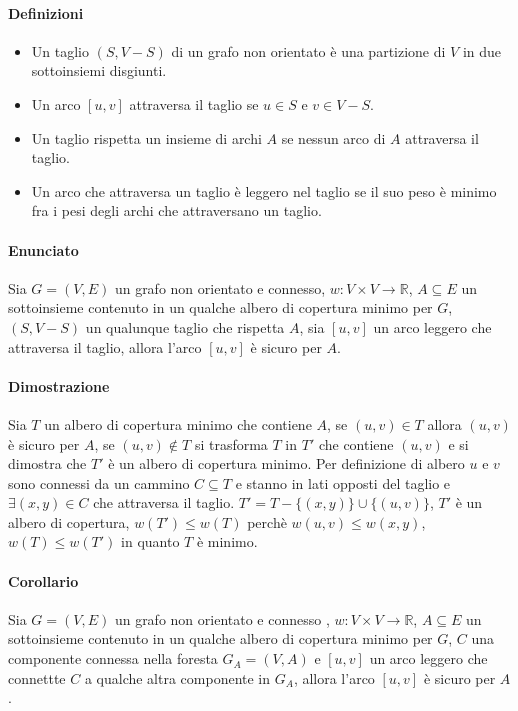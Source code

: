 \paragraph{Definizioni}
\begin{itemize}
	\item Un taglio $(S, V - S)$ di un grafo non orientato \`e una partizione di $V$ in due sottoinsiemi disgiunti.
	\item Un arco $[u, v]$ attraversa il taglio se $u\in S$ e $v\in V-S$.
	\item Un taglio rispetta un insieme di archi $A$ se nessun arco di $A$ attraversa il taglio.
	\item Un arco che attraversa un taglio \`e leggero nel taglio se il suo peso \`e minimo fra i pesi degli archi che attraversano un taglio.
\end{itemize}
\paragraph{Enunciato}
Sia $G=(V, E)$ un grafo non orientato e connesso, $w:V\times V\rightarrow\mathbb{R}$, $A\subseteq E$ un sottoinsieme contenuto in un qualche albero di copertura minimo per $G$, 
$(S, V-S)$ un qualunque taglio che rispetta $A$, sia $[u, v]$ un arco leggero che attraversa il taglio, allora l'arco $[u, v]$ \`e sicuro per $A$. 
\paragraph{Dimostrazione}
Sia $T$ un albero di copertura minimo che contiene $A$, se $(u, v)\in T$ allora $(u, v)$ \`e sicuro per $A$, se $(u, v)\not\in T$ si trasforma $T$ in $T'$ che contiene $(u, v)$ e si 
dimostra che $T'$ \`e un albero di copertura minimo. Per definizione di albero $u$ e $v$ sono connessi da un cammino $C\subseteq T$ e stanno in lati opposti del taglio e $\exists(x, y)
\in C$ che attraversa il taglio. $T'=T-\{(x, y)\}\cup\{(u, v)\}$, $T'$ \`e un albero di copertura, $w(T')\le w(T)$ perch\`e $w(u, v)\le w(x, y)$, $w(T)\le w(T')$ in quanto $T$ \`e 
minimo.
\paragraph{Corollario}
Sia $G=(V, E)$ un grafo non orientato e connesso , $w:V\times V\rightarrow\mathbb{R}$, $A\subseteq E$ un sottoinsieme contenuto in un qualche albero di copertura minimo per $G$, $C$
una componente connessa nella foresta $G_A=(V, A)$ e $[u, v]$ un arco leggero che connettte $C$ a qualche altra componente in $G_A$, allora l'arco $[u, v]$ \`e sicuro per $A$. 
